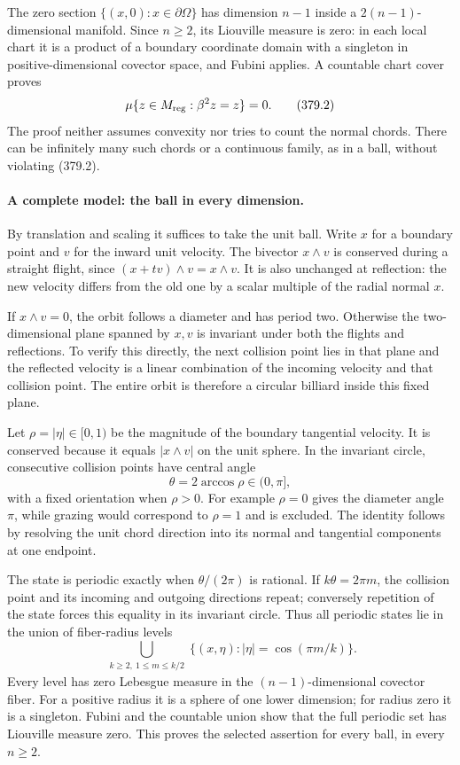 \documentclass[11pt]{article}
\begin{document}
The zero section $\{(x,0):x\in\partial\Omega\}$ has dimension
$n-1$ inside a $2(n-1)$-dimensional manifold. Since $n\geq2$, its
Liouville measure is zero: in each local chart it is a product of
a boundary coordinate domain with a singleton in positive-dimensional
covector space, and Fubini applies. A countable chart cover proves
\[
 \mu\{z\in M_{\rm reg}:\beta^2z=z\}=0.
 \tag{379.2}
\]
The proof neither assumes convexity nor tries to count the normal
chords. There can be infinitely many such chords or a continuous
family, as in a ball, without violating (379.2).

\paragraph{A complete model: the ball in every dimension.}
By translation and scaling it suffices to take the unit ball. Write
$x$ for a boundary point and $v$ for the inward unit velocity. The
bivector $x\wedge v$ is conserved during a straight flight, since
$(x+tv)\wedge v=x\wedge v$. It is also unchanged at reflection:
the new velocity differs from the old one by a scalar multiple of
the radial normal $x$.

If $x\wedge v=0$, the orbit follows a diameter and has period two.
Otherwise the two-dimensional plane spanned by $x,v$ is invariant
under both the flights and reflections. To verify this directly,
the next collision point lies in that plane and the reflected
velocity is a linear combination of the incoming velocity and that
collision point. The entire orbit is therefore a circular billiard
inside this fixed plane.

Let $\rho=|\eta|\in[0,1)$ be the magnitude of the boundary
tangential velocity. It is conserved because it equals
$|x\wedge v|$ on the unit sphere. In the invariant circle, consecutive
collision points have central angle
\[
 \theta=2\arccos\rho\in(0,\pi],
 \tag{379.3}
\]
with a fixed orientation when $\rho>0$. For example $\rho=0$
gives the diameter angle $\pi$, while grazing would correspond
to $\rho=1$ and is excluded. The identity follows by resolving
the unit chord direction into its normal and tangential components
at one endpoint.

The state is periodic exactly when $\theta/(2\pi)$ is rational.
If $k\theta=2\pi m$, the collision point and its incoming and
outgoing directions repeat; conversely repetition of the state forces
this equality in its invariant circle. Thus all periodic states lie
in the union of fiber-radius levels
\[
 \bigcup_{\substack{k\geq2,\ 1\leq m\leq k/2}}
        \{(x,\eta):|\eta|=\cos(\pi m/k)\}.
 \tag{379.4}
\]
Every level has zero Lebesgue measure in the $(n-1)$-dimensional
covector fiber. For a positive radius it is a sphere of one lower
dimension; for radius zero it is a singleton. Fubini and the countable
union show that the full periodic set has Liouville measure zero.
This proves the selected assertion for every ball, in every $n\geq2$.
\end{document}
